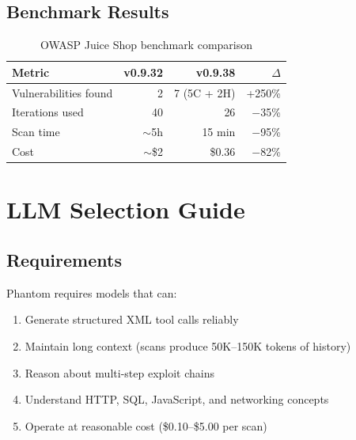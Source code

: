 \documentclass[11pt,a4paper]{article}
\begin{document}
\subsection{Benchmark Results}
\begin{table}[H]
\centering
\caption{OWASP Juice Shop benchmark comparison}
\label{tab:benchmark}
\begin{tabular}{lrrr}
\toprule
\textbf{Metric} & \textbf{v0.9.32} & \textbf{v0.9.38} & \textbf{$\Delta$} \\
\midrule
Vulnerabilities found   & 2       & 7 (5C + 2H) & +250\% \\
Iterations used         & 40      & 26           & $-$35\% \\
Scan time               & $\sim$5h & 15 min      & $-$95\% \\
Cost                    & $\sim$\$2 & \$0.36      & $-$82\% \\
\bottomrule
\end{tabular}
\end{table}


\section{LLM Selection Guide}
\label{sec:llmstudy}

\subsection{Requirements}
Phantom requires models that can:
\begin{enumerate}[noitemsep]
  \item Generate structured XML tool calls reliably
  \item Maintain long context (scans produce 50K--150K tokens of history)
  \item Reason about multi-step exploit chains
  \item Understand HTTP, SQL, JavaScript, and networking concepts
  \item Operate at reasonable cost (\$0.10--\$5.00 per scan)
\end{enumerate}
\end{document}
